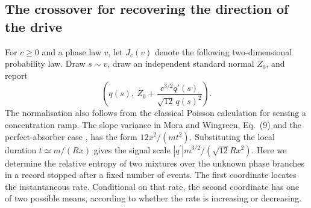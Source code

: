 \subsection{The crossover for recovering the direction of the drive}
For $c\geq0$ and a phase law $v$, let $J_c(v)$ denote the following two-dimensional probability law. Draw $s\sim v$, draw an independent standard normal $Z_0$, and report
\begin{equation}
 \left(q(s),\ Z_0+\frac{c^{3/2}q'(s)}{\sqrt{12}\,q(s)^2}\right).
 \label{eq:criticalchannel}
\end{equation}
The normalisation also follows from the classical Poisson calculation for sensing a concentration ramp. The slope variance in Mora and Wingreen, Eq.~(9) and the perfect-absorber case \cite{mora}, has the form $12x^2/(m t^2)$. Substituting the local duration $t\simeq m/(Rx)$ gives the signal scale $|q^{\prime}|m^{3/2}/(\sqrt{12}Rx^2)$. Here we determine the relative entropy of two mixtures over the unknown phase branches in a record stopped after a fixed number of events. The first coordinate locates the instantaneous rate. Conditional on that rate, the second coordinate has one of two possible means, according to whether the rate is increasing or decreasing.

